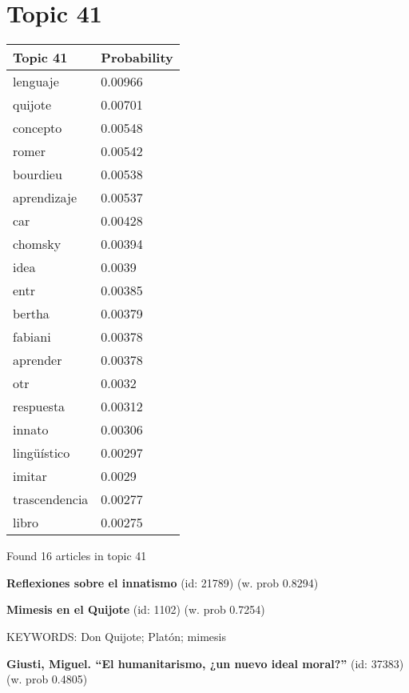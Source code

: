 \documentclass{article}
\begin{document}
\section*{Topic 41}\vfill
\begin{tabular}{ll}
\toprule
      Topic 41 & Probability \\
\midrule
      lenguaje &     0.00966 \\
       quijote &     0.00701 \\
      concepto &     0.00548 \\
         romer &     0.00542 \\
      bourdieu &     0.00538 \\
   aprendizaje &     0.00537 \\
           car &     0.00428 \\
       chomsky &     0.00394 \\
          idea &      0.0039 \\
          entr &     0.00385 \\
        bertha &     0.00379 \\
       fabiani &     0.00378 \\
      aprender &     0.00378 \\
           otr &      0.0032 \\
     respuesta &     0.00312 \\
        innato &     0.00306 \\
   lingüístico &     0.00297 \\
        imitar &      0.0029 \\
 trascendencia &     0.00277 \\
         libro &     0.00275 \\
\bottomrule
\end{tabular}

\vfill
Found 16 articles in topic 41
\vfill

\textbf{Reflexiones sobre el innatismo} (id: 21789)
 (w. prob 0.8294)
\vfill

\textbf{Mimesis en el Quijote} (id: 1102)
 (w. prob 0.7254)


KEYWORDS:
Don Quijote; Platón; mimesis
\vfill

\textbf{Giusti, Miguel. “El humanitarismo, ¿un nuevo ideal moral?”} (id: 37383)
 (w. prob 0.4805)

\vfill
\newpage


\centering
\thispagestyle{empty}
\end{document}

